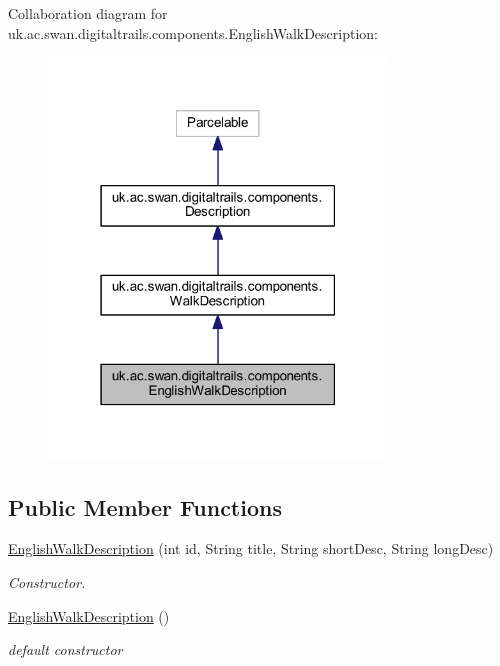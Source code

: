 Collaboration diagram for uk.\+ac.\+swan.\+digitaltrails.\+components.\+English\+Walk\+Description\+:\nopagebreak
\begin{figure}[H]
\begin{center}
\leavevmode
\includegraphics[width=255pt]{classuk_1_1ac_1_1swan_1_1digitaltrails_1_1components_1_1_english_walk_description__coll__graph}
\end{center}
\end{figure}
\subsection*{Public Member Functions}
\begin{DoxyCompactItemize}
\item 
\hyperlink{classuk_1_1ac_1_1swan_1_1digitaltrails_1_1components_1_1_english_walk_description_a082c62b8255cb8a3233bee0ecf6a86db}{English\+Walk\+Description} (int id, String title, String short\+Desc, String long\+Desc)
\begin{DoxyCompactList}\small\item\em Constructor. \end{DoxyCompactList}\item 
\hyperlink{classuk_1_1ac_1_1swan_1_1digitaltrails_1_1components_1_1_english_walk_description_a1ddd86a84daf7bf1294d8cdd0eafa138}{English\+Walk\+Description} ()
\begin{DoxyCompactList}\small\item\em default constructor \end{DoxyCompactList}\end{DoxyCompactItemize}
